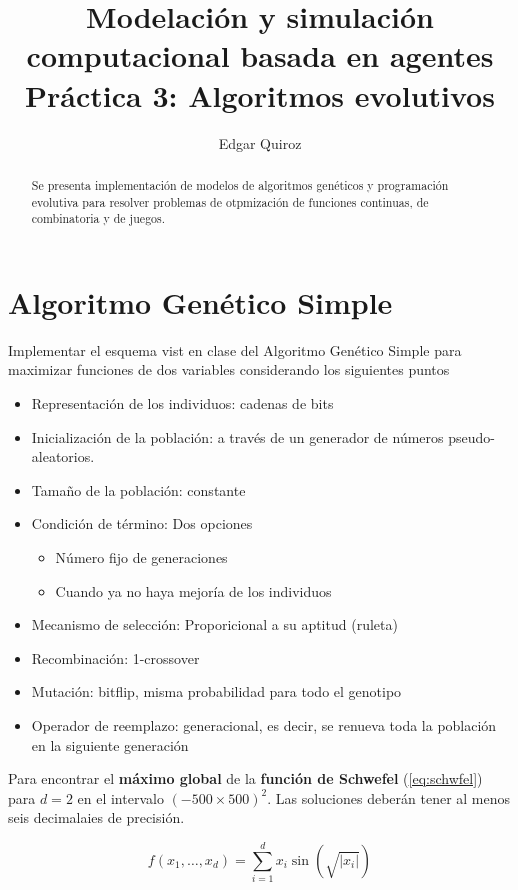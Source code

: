 \documentclass[twocolumn]{article}
\title{
  Modelación y simulación computacional basada en agentes\\
  Práctica 3: Algoritmos evolutivos
}
\author{
  Edgar Quiroz
}
\begin{document}
\maketitle

\begin{abstract}
  Se presenta implementación de modelos de algoritmos genéticos y programación
  evolutiva para resolver problemas de otpmización de funciones continuas, de
  combinatoria y de juegos.
\end{abstract}

\section{Algoritmo Genético Simple}

Implementar el esquema vist en clase del Algoritmo Genético Simple para
maximizar funciones de dos variables considerando los siguientes puntos

\begin{itemize}
  \item Representación de los individuos: cadenas de bits
  \item Inicialización de la población: a través de un generador de números
    pseudo-aleatorios.
  \item Tamaño de la población: constante
  \item Condición de término: Dos opciones
    \begin{itemize}
      \item Número fijo de generaciones
      \item Cuando ya no haya mejoría de los individuos
    \end{itemize}
  \item Mecanismo de selección: Proporicional a su aptitud (ruleta)
  \item Recombinación: 1-crossover
  \item Mutación: bitflip, misma probabilidad para todo el genotipo
  \item Operador de reemplazo: generacional, es decir, se renueva toda la
    población en la siguiente generación
\end{itemize}

Para encontrar el \textbf{máximo global} de la \textbf{función de Schwefel}
(\cref{eq:schwfel}) para $d = 2$ en el intervalo $(-500 \times 500)^{2}$. Las
soluciones deberán tener al menos seis decimalaies de precisión.

\begin{equation}\label{eq:schwfel}
  f(x_{1}, \dots, x_{d}) = \sum_{i = 1}^{d}{x_{i}\sin{(\sqrt{|x_{i}|})}}
\end{equation}
\end{document}
